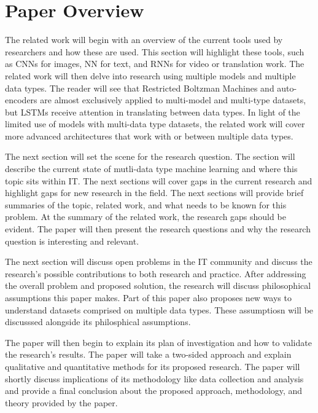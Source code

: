 \chapter{Paper Overview}
The related work will begin with an overview of the current tools used by researchers and how these are used.  This section will highlight these tools, such as CNNs for images, NN for text, and RNNs for video or translation work.  The related work will then delve into research using multiple models and multiple data types.  The reader will see that Restricted Boltzman Machines and auto-encoders are almost exclusively applied to multi-model and multi-type datasets, but LSTMs receive attention in translating between data types. In light of the limited use of models with multi-data type datasets, the related work will cover more advanced architectures that work with or between multiple data types.

The next section will set the scene for the research question.  The section will describe the current state of mutli-data type machine learning and where this topic sits within IT.  The next sections will cover gaps in the current research and highlight gaps for new research in the field.   The next sections will provide brief summaries of the topic, related work, and what needs to be known for this problem.  At the summary of the related work, the research gaps should be evident.  The paper will then present the research questions and why the research question is interesting and relevant. 

The next section will discuss open problems in the IT community and discuss the research's possible contributions to both research and practice.  After addressing the overall problem and proposed solution, the research will discuss philosophical assumptions this paper makes.  Part of this paper also proposes new ways to understand datasets comprised on multiple data types.  These assumptiosn will be discusssed alongside its philosphical assumptions.

The paper will then begin to explain its plan of investigation and how to validate the research's results.  The paper will take a two-sided approach and explain qualitative and quantitative methods for its proposed research.  The paper will shortly discuss implications of its methodology like data collection and analysis and provide a final conclusion about the proposed approach, methodology, and theory provided by the paper.
